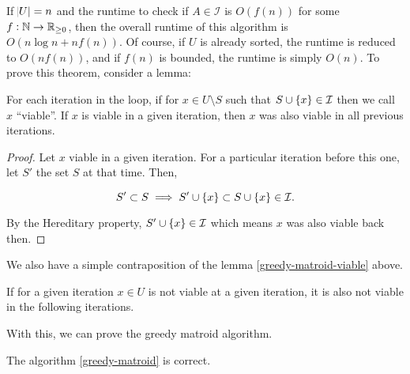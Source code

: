 If $\abs{U}=n$ and the runtime to check if $A \in \mathcal{I}$ is $O(f(n))$ for some $f: \mathbb{N} \to \mathbb{{R}}_{\ge 0}$, then the overall runtime of this algorithm is $O(n\log n + nf(n))$. 
Of course, if $U$ is already sorted, the runtime is reduced to $O(nf(n))$, and if $f(n)$ is bounded, the runtime is simply $O(n)$. 
To prove this theorem, consider a lemma:

\begin{lemma}
    \label{greedy-matroid-viable}
    For each iteration in the loop, if for $x \in U \setminus S$ such that $S \cup \cbr{x} \in \mathcal{I}$ then we call $x$ ``viable''.
    If $x$ is viable in a given iteration, then $x$ was also viable in all previous iterations.
\end{lemma}

\begin{proof}
    Let $x$ viable in a given iteration. For a particular iteration before this one, let $S'$ the set $S$ at that time. Then, 

    \[
        S' \subset S \implies S' \cup \cbr{x} \subset S \cup \cbr{x} \in \mathcal{I}. 
    \]

    By the Hereditary property, $S' \cup \cbr{x} \in \mathcal{I}$ which means $x$ was also viable back then. 
\end{proof}

We also have a simple contraposition of the lemma \ref{greedy-matroid-viable} above. 

\begin{corollary}
    If for a given iteration $x \in U$ is not viable at a given iteration, it is also not viable in the following iterations. 
\end{corollary}

With this, we can prove the greedy matroid algorithm. 

\begin{theorem}
    The algorithm \ref{greedy-matroid} is correct. 
\end{theorem}

